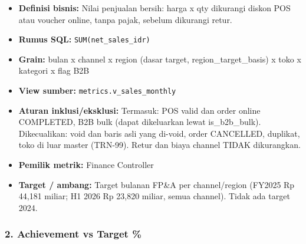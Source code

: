 \documentclass[10pt,a4paper]{article}
\providecommand{\tightlist}{\setlength{\itemsep}{1pt}\setlength{\parskip}{0pt}}
\begin{document}
\begin{itemize}
\tightlist
\item
  \textbf{Definisi bisnis:} Nilai penjualan bersih: harga x qty dikurangi diskon POS atau voucher online, tanpa pajak, sebelum dikurangi retur.
\item
  \textbf{Rumus SQL:} \texttt{SUM(net\_\allowbreak{}sales\_\allowbreak{}idr)}
\item
  \textbf{Grain:} bulan x channel x region (dasar target, region\_\allowbreak{}target\_\allowbreak{}basis) x toko x kategori x flag B2B
\item
  \textbf{View sumber:} \texttt{metrics.v\_\allowbreak{}sales\_\allowbreak{}monthly}
\item
  \textbf{Aturan inklusi/eksklusi:} Termasuk: POS valid dan order online COMPLETED, B2B bulk (dapat dikeluarkan lewat is\_\allowbreak{}b2b\_\allowbreak{}bulk). Dikecualikan: void dan baris asli yang di-void, order CANCELLED, duplikat, toko di luar master (TRN-99). Retur dan biaya channel TIDAK dikurangkan.
\item
  \textbf{Pemilik metrik:} Finance Controller
\item
  \textbf{Target / ambang:} Target bulanan FP\&A per channel/region (FY2025 Rp 44,181 miliar; H1 2026 Rp 23,820 miliar, semua channel). Tidak ada target 2024.
\end{itemize}

\subsubsection{2. Achievement vs Target \%}\label{achievement-vs-target}
\end{document}
